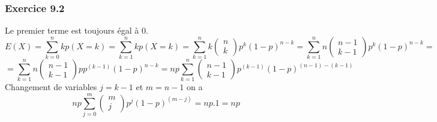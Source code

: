 \documentclass[]{book}
\theoremstyle{definition}
\begin{document}
\subsubsection*{Exercice 9.2}
Le premier terme est toujours \'egal \`a 0.
$$E(X) = \sum_{k=0}^{n}{kp(X=k)} = \sum_{k=1}^{n}{kp(X=k)} = \sum_{k=1}^{n}{k\begin{pmatrix}n\\k\end{pmatrix}p^k(1-p)^{n-k}} = \sum_{k=1}^{n}{n\begin{pmatrix}n-1\\k-1\end{pmatrix}p^k(1-p)^{n-k}} =$$
$$=\sum_{k=1}^{n}{n\begin{pmatrix}n-1\\k-1\end{pmatrix}pp^{(k-1)}(1-p)^{n-k}} = np\sum_{k=1}^{n}{\begin{pmatrix}n-1\\k-1\end{pmatrix}p^{(k-1)}(1-p)^{(n-1)-(k-1)}}$$
Changement de variables $j=k-1$ et $m=n-1$ on a 
$$np\sum_{j=0}^{m}{\begin{pmatrix}m\\j\end{pmatrix}p^{j}(1-p)^{(m-j)}} = np.1 = np$$
\end{document}
